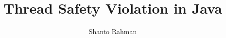 \documentclass[sigconf,review,anonymous]{acmart}    %
\begin{document}

\title{Thread Safety Violation in Java}



\author{Shanto Rahman}
\UTAffiliation
{}

\renewcommand{\shortauthors}{... and A. Shi}

\begin{abstract}

\end{abstract}

\maketitle


%


%





\balance

\end{document}
